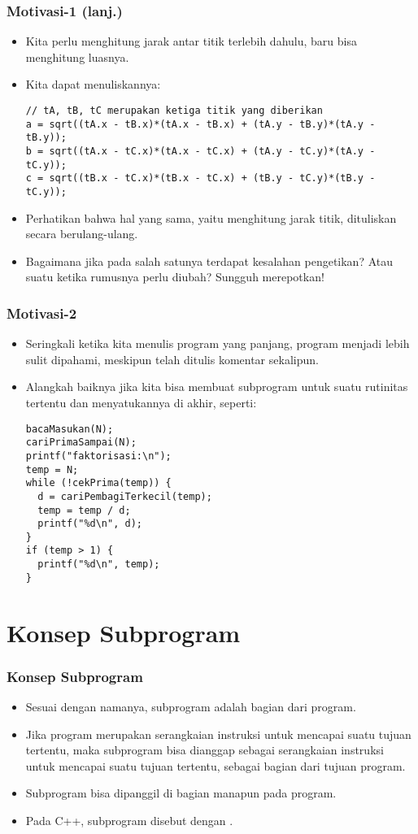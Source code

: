 \begin{frame}[fragile]
\frametitle{Motivasi-1 (lanj.)}
\begin{itemize}
  \item Kita perlu menghitung jarak antar titik terlebih dahulu, baru bisa menghitung luasnya.
  \item Kita dapat menuliskannya:
\begin{lstlisting}
// tA, tB, tC merupakan ketiga titik yang diberikan
a = sqrt((tA.x - tB.x)*(tA.x - tB.x) + (tA.y - tB.y)*(tA.y - tB.y));
b = sqrt((tA.x - tC.x)*(tA.x - tC.x) + (tA.y - tC.y)*(tA.y - tC.y));
c = sqrt((tB.x - tC.x)*(tB.x - tC.x) + (tB.y - tC.y)*(tB.y - tC.y));
\end{lstlisting}
  \item Perhatikan bahwa hal yang sama, yaitu menghitung jarak titik, dituliskan secara berulang-ulang.
  \item Bagaimana jika pada salah satunya terdapat kesalahan pengetikan? Atau suatu ketika rumusnya perlu diubah? Sungguh merepotkan!
\end{itemize}
\end{frame}

\begin{frame}[fragile]
\frametitle{Motivasi-2}
\begin{itemize}
  \item Seringkali ketika kita menulis program yang panjang, program menjadi lebih sulit dipahami, meskipun telah ditulis komentar sekalipun.
  \item Alangkah baiknya jika kita bisa membuat subprogram untuk suatu rutinitas tertentu dan menyatukannya di akhir, seperti:
\begin{lstlisting}
bacaMasukan(N);
cariPrimaSampai(N);
printf("faktorisasi:\n");
temp = N;
while (!cekPrima(temp)) {
  d = cariPembagiTerkecil(temp);
  temp = temp / d;
  printf("%d\n", d);
}
if (temp > 1) {
  printf("%d\n", temp);
}
\end{lstlisting}
\end{itemize}
\end{frame}

\section{Konsep Subprogram}
\frame{\sectionpage}

\begin{frame}
\frametitle{Konsep Subprogram}
\begin{itemize}
  \item Sesuai dengan namanya, subprogram adalah bagian dari program.
  \item Jika program merupakan serangkaian instruksi untuk mencapai suatu tujuan tertentu, maka subprogram bisa dianggap sebagai serangkaian instruksi untuk mencapai suatu tujuan tertentu, \alert{sebagai bagian dari tujuan program}.
  \item Subprogram bisa dipanggil di bagian manapun pada program.
  \item Pada C++, subprogram disebut dengan .
\end{itemize}
\end{frame}

